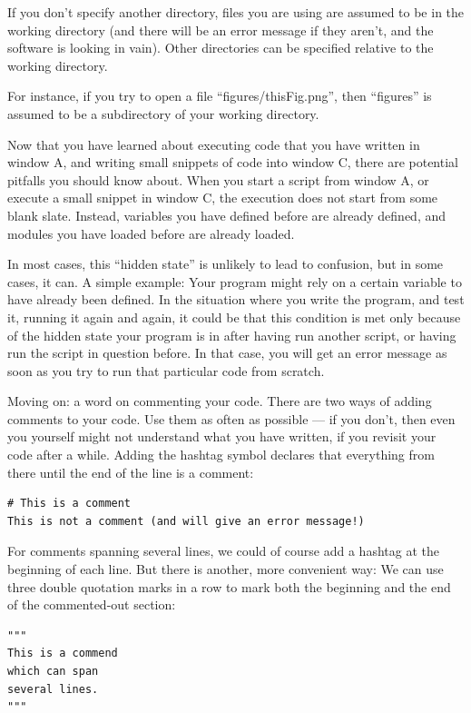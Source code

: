 \documentclass[twocolumn,apj]{openjournal}
\begin{document}
If you don't specify another directory, files you are using are assumed to be in the working directory (and there will be an error message if they aren't, and the software is looking in vain). Other directories can be specified relative to the working directory. 

For instance, if you try to open a file ``figures/thisFig.png'', then ``figures'' is assumed to be a subdirectory of your working directory.

Now that you have learned about executing code that you have written in window A, and writing small snippets of code into window C, there are potential pitfalls you should know about. When you start a script from window A, or execute a small snippet in window C, the execution does not start from some blank slate. Instead, variables you have defined before are already defined, and modules you have loaded before are already loaded. 

In most cases, this ``hidden state'' is unlikely to lead to confusion, but in some cases, it can. A simple example: Your program might rely on a certain variable to have already been defined. In the situation where you write the program, and test it, running it again and again, it could be that this condition is met only because of the hidden state your program is in after having run another script, or having run the script in question before. In that case, you will get an error message as soon as you try to run that particular code from scratch. 

Moving on: a word on commenting your code. There are two ways of adding comments to your code. Use them as often as possible --- if you don't, then even you yourself might not understand what you have written, if you revisit your code after a while. Adding the hashtag symbol declares that everything from there until the end of the line is a comment:
\begin{lstlisting}
# This is a comment
This is not a comment (and will give an error message!)
\end{lstlisting}
For comments spanning several lines, we could of course add a hashtag at the beginning of each line. But there is another, more convenient way: We can use three double quotation marks in a row to mark both the beginning and the end of the commented-out section:
\begin{lstlisting}
"""
This is a commend 
which can span
several lines.
"""
\end{lstlisting}
\end{document}
